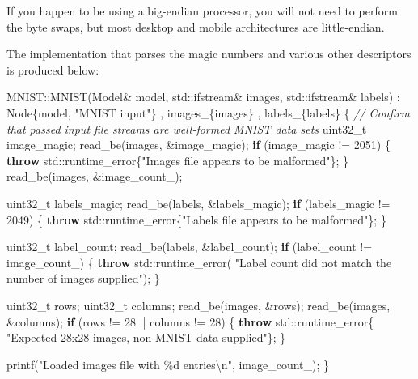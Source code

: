 \documentclass[
]{article}
\newenvironment{Shaded}{}{}
\newcommand{\BuiltInTok}[1]{#1}
\newcommand{\CommentTok}[1]{\textcolor[rgb]{0.38,0.63,0.69}{\textit{#1}}}
\newcommand{\ControlFlowTok}[1]{\textcolor[rgb]{0.00,0.44,0.13}{\textbf{#1}}}
\newcommand{\DataTypeTok}[1]{\textcolor[rgb]{0.56,0.13,0.00}{#1}}
\newcommand{\DecValTok}[1]{\textcolor[rgb]{0.25,0.63,0.44}{#1}}
\newcommand{\NormalTok}[1]{#1}
\newcommand{\SpecialCharTok}[1]{\textcolor[rgb]{0.25,0.44,0.63}{#1}}
\newcommand{\StringTok}[1]{\textcolor[rgb]{0.25,0.44,0.63}{#1}}
\newcommand{\VariableTok}[1]{\textcolor[rgb]{0.10,0.09,0.49}{#1}}
\begin{document}
If you happen to be using a big-endian processor, you will not need to
perform the byte swaps, but most desktop and mobile architectures are
little-endian.

The implementation that parses the magic numbers and various other
descriptors is produced below:

\begin{Shaded}
\begin{Highlighting}[]
\NormalTok{MNIST::MNIST(Model\& model, }\BuiltInTok{std::}\NormalTok{ifstream\& images, }\BuiltInTok{std::}\NormalTok{ifstream\& labels)}
\NormalTok{    : Node\{model, }\StringTok{"MNIST input"}\NormalTok{\}}
\NormalTok{    , }\VariableTok{images\_}\NormalTok{\{images\}}
\NormalTok{    , }\VariableTok{labels\_}\NormalTok{\{labels\}}
\NormalTok{\{}
    \CommentTok{// Confirm that passed input file streams are well{-}formed MNIST data sets}
    \DataTypeTok{uint32\_t}\NormalTok{ image\_magic;}
\NormalTok{    read\_be(images, \&image\_magic);}
    \ControlFlowTok{if}\NormalTok{ (image\_magic != }\DecValTok{2051}\NormalTok{)}
\NormalTok{    \{}
        \ControlFlowTok{throw} \BuiltInTok{std::}\NormalTok{runtime\_error\{}\StringTok{"Images file appears to be malformed"}\NormalTok{\};}
\NormalTok{    \}}
\NormalTok{    read\_be(images, \&}\VariableTok{image\_count\_}\NormalTok{);}

    \DataTypeTok{uint32\_t}\NormalTok{ labels\_magic;}
\NormalTok{    read\_be(labels, \&labels\_magic);}
    \ControlFlowTok{if}\NormalTok{ (labels\_magic != }\DecValTok{2049}\NormalTok{)}
\NormalTok{    \{}
        \ControlFlowTok{throw} \BuiltInTok{std::}\NormalTok{runtime\_error\{}\StringTok{"Labels file appears to be malformed"}\NormalTok{\};}
\NormalTok{    \}}

    \DataTypeTok{uint32\_t}\NormalTok{ label\_count;}
\NormalTok{    read\_be(labels, \&label\_count);}
    \ControlFlowTok{if}\NormalTok{ (label\_count != }\VariableTok{image\_count\_}\NormalTok{)}
\NormalTok{    \{}
        \ControlFlowTok{throw} \BuiltInTok{std::}\NormalTok{runtime\_error(}
            \StringTok{"Label count did not match the number of images supplied"}\NormalTok{);}
\NormalTok{    \}}

    \DataTypeTok{uint32\_t}\NormalTok{ rows;}
    \DataTypeTok{uint32\_t}\NormalTok{ columns;}
\NormalTok{    read\_be(images, \&rows);}
\NormalTok{    read\_be(images, \&columns);}
    \ControlFlowTok{if}\NormalTok{ (rows != }\DecValTok{28}\NormalTok{ || columns != }\DecValTok{28}\NormalTok{)}
\NormalTok{    \{}
        \ControlFlowTok{throw} \BuiltInTok{std::}\NormalTok{runtime\_error\{}
            \StringTok{"Expected 28x28 images, non{-}MNIST data supplied"}\NormalTok{\};}
\NormalTok{    \}}

\NormalTok{    printf(}\StringTok{"Loaded images file with }\SpecialCharTok{\%d}\StringTok{ entries}\SpecialCharTok{\textbackslash{}n}\StringTok{"}\NormalTok{, }\VariableTok{image\_count\_}\NormalTok{);}
\NormalTok{\}}
\end{Highlighting}
\end{Shaded}
\end{document}
